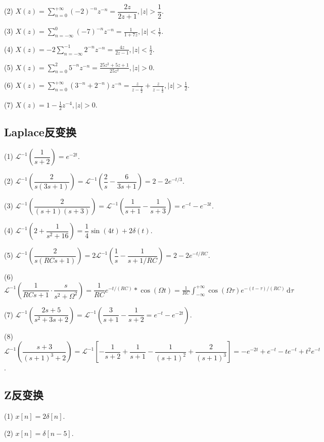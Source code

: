 (2) $X(z)=\displaystyle\sum_{n=0}^{+\infty}(-2)^{-n}z^{-n}=\dfrac{2z}{2z+1},|z|>\dfrac{1}{2}$.

(3) $X(z)=\displaystyle\sum_{n=-\infty}^{0}(-7)^{-n}z^{-n}=\frac{1}{1+7z},|z|<\frac{1}{7}$.

(4) $X(z)=\displaystyle-2\sum_{n=-\infty}^{-1}2^{-n}z^{-n}=\frac{4z}{2z-1},|z|<\frac{1}{2}$.

(5) $X(z)=\displaystyle\sum_{n=0}^{2}5^{-n}z^{-n}=\frac{25z^2+5z+1}{25z^2},|z|>0$.

(6) $X(z)=\displaystyle\sum_{n=0}^{+\infty}(3^{-n}+2^{-n})z^{-n}=\frac{z}{z-\frac{1}{2}}+\frac{z}
{z-\frac{1}{3}},|z|>\frac{1}{2}$.

(7) $X(z)=1-\frac{1}{2}z^{-4},|z|>0$.

\subsection{Laplace反变换}

(1) $\mathscr{L}^{-1}(\dfrac{1}{s+2})=e^{-2t}$.


(2) $\mathscr{L}^{-1}(\dfrac{2}{s(3s+1)})=\mathscr{L}^{-1}(\dfrac{2}{s}-\dfrac{6}{3s+1})=2-2e^{-t/3}$.


(3) $\mathscr{L}^{-1}(\dfrac{2}{(s+1)(s+3)})=\mathscr{L}^{-1}(\dfrac{1}{s+1}-\dfrac{1}{s+3})=e^{-t}-e^{-3t}$.


(4) $\mathscr{L}^{-1}(2+\dfrac{1}{s^2+16})=\dfrac{1}{4}\sin(4t)+2\delta(t)$.


(5) $\mathscr{L}^{-1}(\dfrac{2}{s(RCs+1)})=2\mathscr{L}^{-1}(\dfrac{1}{s}-\dfrac{1}{s+1/RC})=2-2e^{-t/RC}$.

(6) $\mathscr{L}^{-1}(\dfrac{1}{RCs+1}\cdot\dfrac{s}{s^2+\Omega^2})=\dfrac{1}{RC}e^{-t/(RC)}*\cos(\Omega t)
=\displaystyle\frac{1}{RC}\int_{-\infty}^{+\infty}\cos(\Omega \tau)e^{-(t-\tau)/(RC)}\,\mathrm{d}\tau
$

(7) $\mathscr{L}^{-1}(\dfrac{2s+5}{s^2+3s+2})=\mathscr{L}^{-1}(\dfrac{3}{s+1}-\dfrac{1}{s+2}=e^{-t}-e^{-2t})$.

(8) $\mathscr{L}^{-1}(\dfrac{s+3}{(s+1)^3+2})=\mathscr{L}^{-1}[-\dfrac{1}{s+2}+\dfrac{1}{s+1}-
\dfrac{1}{(s+1)^2}+\dfrac{2}{(s+1)^3}]=-e^{-2t}+e^{-t}-te^{-t}+t^2e^{-t}$.

\subsection{Z反变换}

(1) $x[n]=2\delta[n]$.

(2) $x[n]=\delta[n-5]$.

